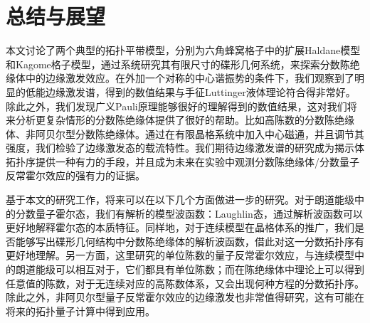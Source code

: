\chapter{总结与展望}
\label{summary}


本文讨论了两个典型的拓扑平带模型，分别为六角蜂窝格子中的扩展Haldane模型和Kagome格子模型，通过系统研究其有限尺寸的碟形几何系统，来探索分数陈绝缘体中的边缘激发效应。在外加一个对称的中心谐振势的条件下，我们观察到了明显的低能边缘激发谱，得到的数值结果与手征Luttinger液体理论符合得非常好。除此之外，我们发现广义Pauli原理能够很好的理解得到的数值结果，这对我们将来分析更复杂情形的分数陈绝缘体提供了很好的帮助。比如高陈数的分数陈绝缘体、非阿贝尔型分数陈绝缘体。通过在有限晶格系统中加入中心磁通，并且调节其强度，我们检验了边缘激发态的载流特性。我们期待边缘激发谱的研究成为揭示体拓扑序提供一种有力的手段，并且成为未来在实验中观测分数陈绝缘体/分数量子反常霍尔效应的强有力的证据。

基于本文的研究工作，将来可以在以下几个方面做进一步的研究。对于朗道能级中的分数量子霍尔态，我们有解析的模型波函数：Laughlin态，通过解析波函数可以更好地解释霍尔态的本质特征。同样地，对于连续模型在晶格体系的推广，我们是否能够写出碟形几何结构中分数陈绝缘体的解析波函数，借此对这一分数拓扑序有更好地理解。另一方面，这里研究的单位陈数的量子反常霍尔效应，与连续模型中的朗道能级可以相互对于，它们都具有单位陈数；而在陈绝缘体中理论上可以得到任意值的陈数，对于无连续对应的高陈数体系，又会出现何种方程的分数拓扑序。除此之外，非阿贝尔型量子反常霍尔效应的边缘激发也非常值得研究，这有可能在将来的拓扑量子计算中得到应用。

